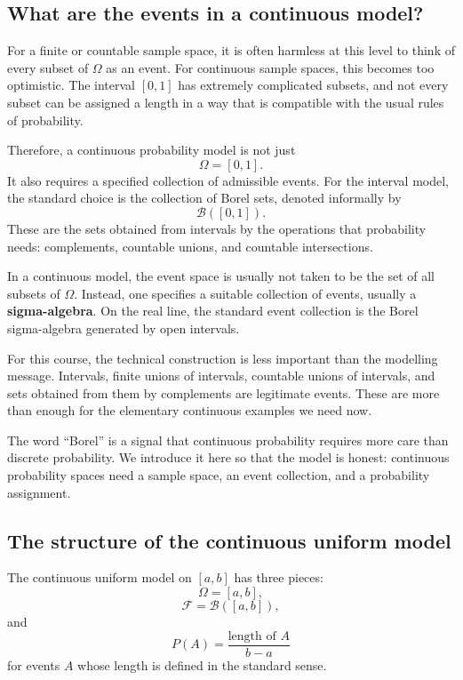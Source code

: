 \subsection*{What are the events in a continuous model?}

For a finite or countable sample space, it is often harmless at this level to
think of every subset of \(\Omega\) as an event. For continuous sample spaces,
this becomes too optimistic. The interval \([0,1]\) has extremely complicated
subsets, and not every subset can be assigned a length in a way that is
compatible with the usual rules of probability.

Therefore, a continuous probability model is not just
\[
\Omega=[0,1].
\]
It also requires a specified collection of admissible events. For the interval
model, the standard choice is the collection of Borel sets, denoted informally by
\[
\mathcal{B}([0,1]).
\]
These are the sets obtained from intervals by the operations that probability
needs: complements, countable unions, and countable intersections.

\begin{definitionbox}
In a continuous model, the event space is usually not taken to be the set of all
subsets of \(\Omega\). Instead, one specifies a suitable collection of events,
usually a \textbf{sigma-algebra}. On the real line, the standard event collection
is the Borel sigma-algebra generated by open intervals.
\end{definitionbox}

For this course, the technical construction is less important than the modelling
message. Intervals, finite unions of intervals, countable unions of intervals,
and sets obtained from them by complements are legitimate events. These are more
than enough for the elementary continuous examples we need now.

\begin{remarkbox}
The word ``Borel'' is a signal that continuous probability requires more care
than discrete probability. We introduce it here so that the model is honest:
continuous probability spaces need a sample space, an event collection, and a
probability assignment.
\end{remarkbox}

\subsection*{The structure of the continuous uniform model}

The continuous uniform model on \([a,b]\) has three pieces:
\[
\Omega=[a,b],
\]
\[
\mathcal{F}=\mathcal{B}([a,b]),
\]
and
\[
P(A)=\frac{\text{length of }A}{b-a}
\]
for events \(A\) whose length is defined in the standard sense.

